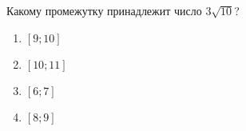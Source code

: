  \setanswer{}
\begin{ex}
	Какому промежутку принадлежит число $3\sqrt{10}$?
	
	\selectanswer
	\begin{multicols}{4}
		\begin{enumerate}[label=\arabic*)]
			\item $[9;10]$
			\item $[10;11]$
			\item $[6;7]$
			\item $[8;9]$
		\end{enumerate}
	\end{multicols}
\end{ex}